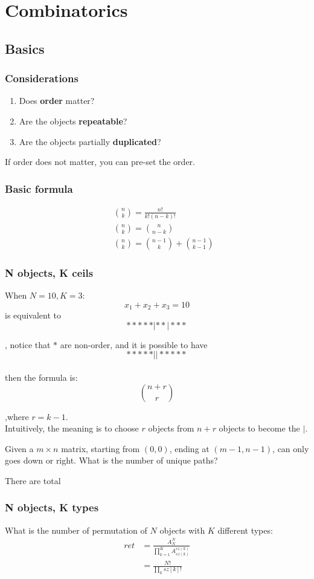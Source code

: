\chapter{Combinatorics}
\section{Basics}
\subsection{Considerations}
\begin{enumerate}
\item Does \textbf{order} matter?
\item Are the objects \textbf{repeatable}?
\item Are the objects partially \textbf{duplicated}?
\end{enumerate}
If order does not matter, you can pre-set the order. 
\subsection{Basic formula}
\begin{eqnarray*}
&& {n \choose k} = \frac{n!}{k!(n-k)!} \\
&& {n \choose k} = {n \choose n-k} \\
&& {n\choose k} = {n-1\choose k} + {n-1 \choose k-1}
\end{eqnarray*}

\subsection{N objects, K ceils}
When $N=10, K=3$:
$$
x_1 + x_2 + x_3 = 10
$$
is equivalent to
$$
*****|**|***
$$

, notice that $*$ are non-order, and it is possible to have 
$$
*****||*****
$$
\\
then the formula is:
$$
{n+r \choose r}
$$

,where $r=k-1$. 
\\
Intuitively, the meaning is to choose $r$ objects from $n+r$ objects to become the $|$.

 Given a $m \times n$ matrix, starting from $(0, 0)$, ending at $(m-1, n-1)$, can only goes down or right. What is the number of unique paths?

There are total 

\subsection{N objects, K types} \label{N_objects_K_types}
What is the number of permutation of $N$ objects with $K$ different types:
\begin{align*}
ret &= \frac{A_N^N}{\prod_{k=1}^K{A_{sz(k)}^{sz(k)}}} \\
&= \frac{N!}{\prod_{k} sz[k]!}
\end{align*}

